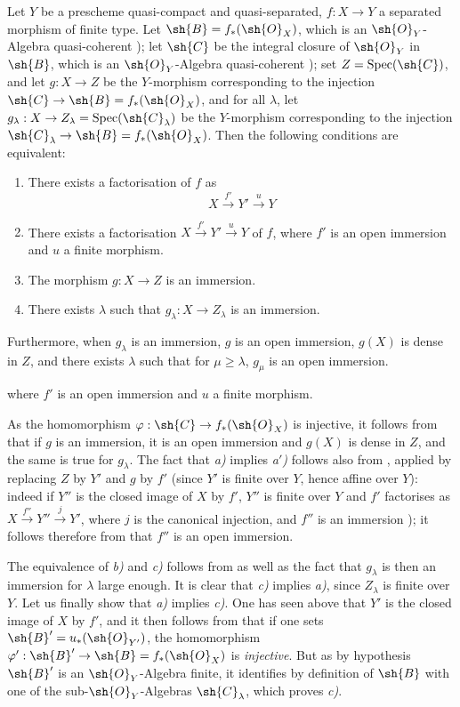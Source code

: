 \begin{proposition}[8.12.3]
\label{IV.8.12.3}
Let $Y$ be a prescheme quasi-compact and quasi-separated, $f:X\to Y$ a separated morphism of finite type.
Let $\sh{B}=f_*(\sh{O}_X)$, which is an $\sh{O}_Y$-Algebra quasi-coherent ); let $\sh{C}$ be the integral closure of $\sh{O}_Y$ in $\sh{B}$, which is an $\sh{O}_Y$-Algebra quasi-coherent ); set $Z=\operatorname{Spec}(\sh{C})$, and let $g:X\to Z$ be the $Y$-morphism corresponding to the injection $\sh{C}\to\sh{B}=f_*(\sh{O}_X)$, and for all $\lambda$, let $g_\lambda:X\to Z_\lambda=\operatorname{Spec}(\sh{C}_\lambda)$ be the $Y$-morphism corresponding to the injection $\sh{C}_\lambda\to\sh{B}=f_*(\sh{O}_X)$.
Then the following conditions are equivalent:
\begin{enumerate}[label=\emph{\alph*)}]
  \item There exists a factorisation of $f$ as
\[
X\xrightarrow{f'}Y'\xrightarrow{u}Y
\]
  \item[\rm a$'$)] There exists a factorisation $X\xrightarrow{f'}Y'\xrightarrow{u}Y$ of $f$, where $f'$ is an open immersion and $u$ a finite morphism.
  \item The morphism $g:X\to Z$ is an immersion.
  \item There exists $\lambda$ such that $g_\lambda:X\to Z_\lambda$ is an immersion.
\end{enumerate}
Furthermore, when $g_\lambda$ is an immersion, $g$ is an open immersion, $g(X)$ is dense in $Z$, and there exists $\lambda$ such that for $\mu\geqslant\lambda$, $g_\mu$ is an open immersion.
\end{proposition}

where $f'$ is an open immersion and $u$ a finite morphism.

As the homomorphism $\varphi:\sh{C}\to f_*(\sh{O}_X)$ is injective, it follows from  that if $g$ is an immersion, it is an open immersion and $g(X)$ is dense in $Z$, and the same is true for $g_\lambda$.
The fact that \emph{a)} implies \emph{a$'$)} follows also from , applied by replacing $Z$ by $Y'$ and $g$ by $f'$ (since $Y'$ is finite over $Y$, hence affine over $Y$): indeed if $Y''$ is the closed image of $X$ by $f'$, $Y''$ is finite over $Y$ and $f'$ factorises as $X\xrightarrow{f''}Y''\xrightarrow{j}Y'$, where $j$ is the canonical injection, and $f''$ is an immersion ); it follows therefore from  that $f''$ is an open immersion.

The equivalence of \emph{b)} and \emph{c)} follows from  as well as the fact that $g_\lambda$ is then an immersion for $\lambda$ large enough.
It is clear that \emph{c)} implies \emph{a)}, since $Z_\lambda$ is finite over $Y$.
Let us finally show that \emph{a)} implies \emph{c)}.
One has seen above that $Y'$ is the closed image of $X$ by $f'$, and it then follows from  that if one sets $\sh{B}'=u_*(\sh{O}_{Y'})$, the homomorphism $\varphi':\sh{B}'\to\sh{B}=f_*(\sh{O}_X)$ is \emph{injective}.
But as by hypothesis $\sh{B}'$ is an $\sh{O}_Y$-Algebra finite, it identifies by definition of $\sh{B}$ with one of the sub-$\sh{O}_Y$-Algebras $\sh{C}_\lambda$, which proves \emph{c)}.

